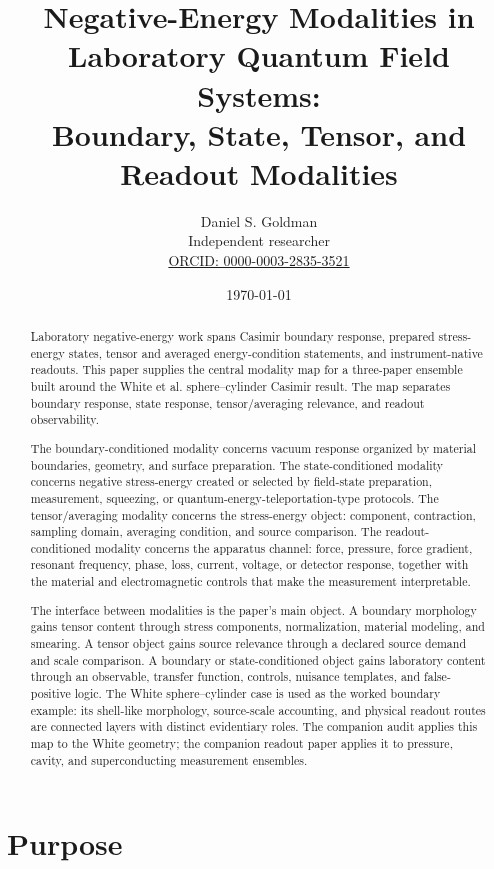 \documentclass[11pt]{article}
\title{\bfseries Negative-Energy Modalities in Laboratory Quantum Field Systems:\\
Boundary, State, Tensor, and Readout Modalities}
\author{
Daniel S. Goldman\\
Independent researcher\\
\href{https://orcid.org/0000-0003-2835-3521}{ORCID: 0000-0003-2835-3521}
}
\date{\today}
\begin{document}
\maketitle

\begin{abstract}
Laboratory negative-energy work spans Casimir boundary response, prepared
stress-energy states, tensor and averaged energy-condition statements, and
instrument-native readouts. This paper supplies the central modality map for a
three-paper ensemble built around the White et al. sphere--cylinder Casimir
result. The map separates boundary response, state response,
tensor/averaging relevance, and readout observability.

The boundary-conditioned modality concerns vacuum response organized by
material boundaries, geometry, and surface preparation. The state-conditioned
modality concerns negative stress-energy created or selected by field-state
preparation, measurement, squeezing, or quantum-energy-teleportation-type
protocols. The tensor/averaging modality concerns the stress-energy object:
component, contraction, sampling domain, averaging condition, and source
comparison. The readout-conditioned modality concerns the apparatus channel:
force, pressure, force gradient, resonant frequency, phase, loss, current,
voltage, or detector response, together with the material and electromagnetic
controls that make the measurement interpretable.

The interface between modalities is the paper's main object. A boundary
morphology gains tensor content through stress components, normalization,
material modeling, and smearing. A tensor object gains source relevance
through a declared source demand and scale comparison. A boundary or
state-conditioned object gains laboratory content through an observable,
transfer function, controls, nuisance templates, and false-positive logic.
The White sphere--cylinder case is used as the worked boundary example:
its shell-like morphology, source-scale accounting, and physical readout
routes are connected layers with distinct evidentiary roles. The companion
audit applies this map to the White geometry; the companion readout paper
applies it to pressure, cavity, and superconducting measurement ensembles.
\end{abstract}

\section{Purpose}
\end{document}
